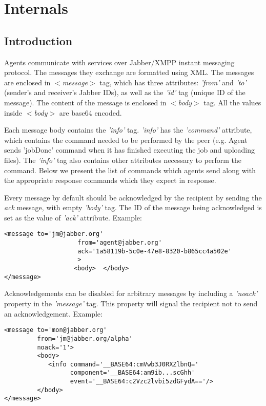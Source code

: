 \chapter{\cernvmcopilot Internals}
\label{sct:protocol}

\section{Introduction}
Agents communicate with services over Jabber/XMPP \cite{rfc3920,rfc3921} instant messaging protocol. The messages they
exchange are formatted using XML. The messages are enclosed in \emph{$<$message$>$} tag, which has three attributes: \emph{'from'} and
\emph{'to'} (sender's and receiver's Jabber IDs), as well as the \emph{'id'} tag (unique ID of the message). The content of the message is enclosed in \emph{$<$body$>$} tag. All the values inside \emph{$<$body$>$} are
base64 \cite{rfc3548} encoded.

Each message body contains the \emph{'info'} tag. \emph{'info'} has the \emph{'command'} attribute, which contains the command needed
to be performed by the peer (e.g. Agent sends 'jobDone' command when it has finished executing the job and uploading files). The \emph{'info'} tag also contains other attributes necessary to perform the command. Below we present the list of commands which agents send along with the appropriate response commands which they expect in response. 

Every message by default should be acknowledged by the recipient by sending the \emph{ack} message, with empty \emph{'body'} tag. The ID of the message being acknowledged is set as the value of \emph{'ack'} attribute.
Example:

\lstset{tabsize=2, basicstyle=\footnotesize, captionpos=b}
\lstset{frame=single, language=XML}
\begin{lstlisting}
<message to='jm@jabber.org'
                    from='agent@jabber.org'
                    ack='1a58119b-5c0e-47e8-8320-b865cc4a502e'
                    >
                   <body>  </body>
</message>
\end{lstlisting}

Acknowledgements can be disabled for arbitrary messages by including a \emph{'noack'} property in the \emph{'message'} tag.
This property will signal the recipient not to send an acknowledgement.
Example:

\lstset{tabsize=2, basicstyle=\footnotesize, captionpos=b}
\lstset{caption=Example message , label=fig:noack}
\lstset{frame=single, language=XML}
\begin{lstlisting}
<message to='mon@jabber.org'
         from='jm@jabber.org/alpha'
         noack='1'>
         <body>
            <info command='__BASE64:cmVwb3J0RXZlbnQ='
                  component='__BASE64:am9ib...scGhh'
                  event='__BASE64:c2Vzc2lvbi5zdGFydA=='/>
         </body>
</message>
\end{lstlisting}

